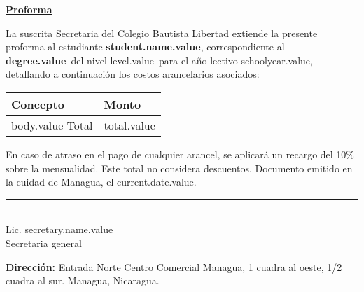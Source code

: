 \documentclass[12pt]{article}
\newcommand{\degreeName}{degree.value}
\newcommand{\levelName}{level.value}
\newcommand{\studentName}{student.name.value}
\newcommand{\schoolYear}{schoolyear.value}
\newcommand{\currentDate}{current.date.value}
\newcommand{\totalAmount}{total.value}
\newcommand{\secretaryName}{secretary.name.value}
\begin{document}
    \begin{center}
        \underline{\textbf{\Large Proforma}}
    \end{center}
    La suscrita Secretaria del Colegio Bautista Libertad extiende la presente proforma al estudiante \textbf{\studentName},
    correspondiente al \textbf{\degreeName}~del nivel \levelName~para el año lectivo \schoolYear, detallando a continuación
    los costos arancelarios asociados:
    \begin{table}[H]
        \centering
        \begin{tabular}{|p{4.5cm}|p{2.5cm}|}
            \hline
            Concepto & Monto\\\hline\hline
            body.value \hline
            Total & \totalAmount \\\hline
        \end{tabular}
    \end{table}
    En caso de atraso en el pago de cualquier arancel, se aplicará un recargo del 10\% sobre la mensualidad.
    Este total no considera descuentos.
    Documento emitido en la cuidad de Managua, el \currentDate.

    \vfill
    \begin{center}
        \rule{5cm}{0.4pt}\\[1mm]
        Lic. \secretaryName\\
        Secretaria general
    \end{center}
    \vfill

    \textbf{Dirección:} Entrada Norte Centro Comercial Managua, 1 cuadra al oeste, 1/2 cuadra al sur. Managua, Nicaragua.
\end{document}
